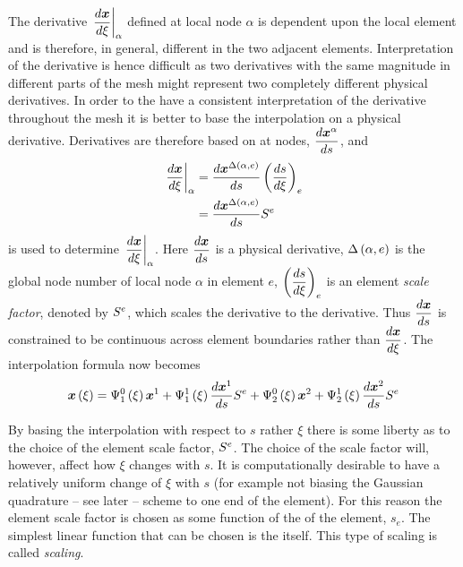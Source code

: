The derivative $\evalat{\dby{\vect{x}}{\xi}}{\alpha}$ defined at local node
$\alpha$ is dependent upon the local element \xicoord and is therefore, in
general, different in the two adjacent elements. Interpretation of the
derivative is hence difficult as two derivatives with the same magnitude in
different parts of the mesh might represent two completely different physical
derivatives. In order to the have a consistent interpretation of the derivative
throughout the mesh it is better to base the interpolation on a physical
derivative. Derivatives are therefore based on \arclen at nodes,
$\dby{\nodept{\vect{x}}{\alpha}}{s}$, and
\begin{equation}
  \begin{split}
    \evalat{\dby{\vect{x}}{\xi}}{\alpha}&=\dby{\nodept{\vect{x}}{
        \fnof{\Delta}{\alpha,e}}}{s}\pbrac{\dby{s}{\xi}}_{e} \\ &=
    \dby{\nodept{\vect{x}}{\fnof{\Delta}{\alpha,e}}}{s}\esfone{e}
  \end{split}
  \label{eqn:xitosch}
\end{equation}
is used to determine $\evalat{\dby{\vect{x}}{\xi}}{\alpha}$. Here
$\dby{\vect{x}}{s}$ is a physical \arclen derivative,
$ \Delta\left( \alpha,e \right) $ is the global node number of local node $\alpha$ in
element $e$, $\left(  \dfrac{ d s}{d \xi}  \right)_{e}$ is an element \emph{scale factor}, denoted by $ S^{e} $, which scales
the \arclen derivative to the \xicoord derivative.  Thus $\dby{\vect{x}}{s}$
is constrained to be continuous across element boundaries rather than
$\dby{\vect{x}}{\xi}$. The \cubicherm interpolation formula now becomes
\begin{equation}
  \fnof{\vect{x}}{\xi}=\chbfn{1}{0}{\xi}\nodept{\vect{x}}{1}+\chbfn{1}{1}{\xi}
  \dby{\nodept{\vect{x}}{1}}{s}\esfone{e}+\chbfn{2}{0}{\xi}\nodept{\vect{x}}{2}+
  \chbfn{2}{1}{\xi}\dby{\nodept{\vect{x}}{2}}{s}\esfone{e}
  \label{eqn:chseinterpolation}
\end{equation}

By basing the interpolation with respect to $s$ rather $\xi$ there is some
liberty as to the choice of the element scale factor, $ S^{e} $. The choice
of the scale factor will, however, affect how $\xi$ changes with $s$.  It is
computationally desirable to have a relatively uniform change of $\xi$ with
$s$ (for example not biasing the Gaussian quadrature -- see later -- scheme to
one end of the element). For this reason the element scale factor is chosen as
some function of the \arclen of the element, $s_{e}$. The simplest linear
function that can be chosen is the \arclen itself. This type of scaling is
called \emph{\arclen scaling}.

